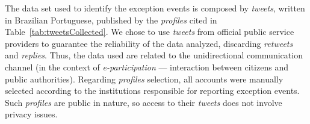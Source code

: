 \documentclass[runningheads]{llncs}
\begin{document}
The data set used to identify the exception events is composed by \textit{tweets}, written in Brazilian Portuguese, published by the \textit{profiles} cited in Table~\ref{tab:tweetsCollected}. We chose to use \textit{tweets} from official public service providers to guarantee the reliability of the data analyzed, discarding \textit{retweets} and \textit{replies}. Thus, the data used are related to the unidirectional communication channel (in the context of \textit{e-participation} --- interaction between citizens and public authorities). Regarding \textit{profiles} selection, all accounts were manually selected according to the institutions responsible for reporting exception events. Such \textit{profiles} are public in nature, so access to their \textit{tweets} does not involve privacy issues. 

\end{document}
